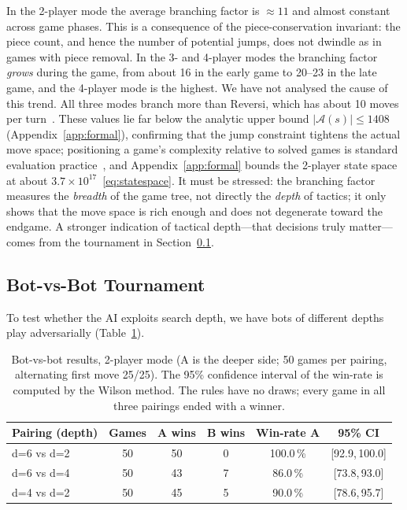 \noindent In the 2-player mode the average branching factor is $\approx 11$
and almost constant across game phases. This is a consequence of the
piece-conservation invariant: the piece count, and hence the number of
potential jumps, does not dwindle as in games with piece removal. In the 3-
and 4-player modes the branching factor \emph{grows} during the game, from
about 16 in the early game to 20--23 in the late game, and the 4-player mode
is the highest. We have not analysed the cause of this trend. All three
modes branch more than Reversi, which has about 10 moves per
turn~\citep{allis1994searching}. These values lie far below the analytic
upper bound $|\mathcal A(s)|\le 1408$ (Appendix~\ref{app:formal}),
confirming that the jump constraint tightens the actual move space;
positioning a game's complexity relative to solved games is standard
evaluation practice~\citep{herik2002games}, and Appendix~\ref{app:formal}
bounds the 2-player state space at about $3.7\times10^{17}$~\eqref{eq:statespace}. It must be stressed: the
branching factor measures the \emph{breadth} of the game tree, not directly
the \emph{depth} of tactics; it only shows that the move space is rich
enough and does not degenerate toward the endgame. A stronger indication of tactical
depth---that decisions truly matter---comes from the tournament in
Section~\ref{sec:eval_tournament}.

\subsection{Bot-vs-Bot Tournament}
\label{sec:eval_tournament}

To test whether the AI exploits search depth, we have bots of different
depths play adversarially (Table~\ref{tab:tournament}).

\begin{table}[H]
  \centering
  \caption{Bot-vs-bot results, 2-player mode (A is the deeper side; 50
  games per pairing, alternating first move 25/25). The 95\% confidence
  interval of the win-rate is computed by the Wilson method. The rules have
  no draws; every game in all three pairings ended with a winner.}
  \label{tab:tournament}
  \setlength{\tabcolsep}{4.5pt}
  \begin{tabular}{lccccc}
    \toprule
    \textbf{Pairing (depth)} & \textbf{Games} & \textbf{A wins}
      & \textbf{B wins} & \textbf{Win-rate A}
      & \textbf{95\% CI} \\
    \midrule
    d=6 vs d=2 & 50 & 50 & 0 & 100.0\,\% & [92.9,\,100.0] \\
    d=6 vs d=4 & 50 & 43 & 7 & 86.0\,\% & [73.8,\,93.0] \\
    d=4 vs d=2 & 50 & 45 & 5 & 90.0\,\% & [78.6,\,95.7] \\
    \bottomrule
  \end{tabular}
\end{table}

